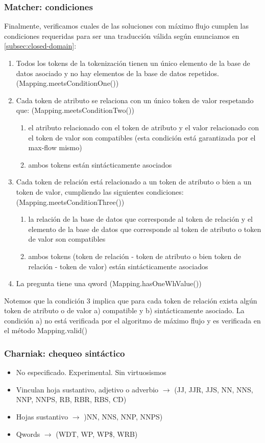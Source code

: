 \begin{frame}
\frametitle{Matcher: condiciones}

Finalmente, verificamos cuales de las soluciones con máximo flujo cumplen las condiciones requeridas para ser una traducción válida según enunciamos en \ref{subsec:closed-domain}:

\begin{enumerate}
\item Todos  los tokens de la tokenización tienen un único elemento de la base de datos asociado y no hay elementos de la base de datos repetidos. (Mapping.meetsConditionOne())
\item Cada token de atributo se relaciona con un único token de valor respetando que: (Mapping.meetsConditionTwo())
\begin{enumerate}
\item el atributo relacionado con el token de atributo y el valor relacionado con el token de valor son compatibles (esta condición está garantizada por el max-flow mismo)
\item ambos tokens están sintácticamente asociados
\end{enumerate}
\item Cada token de relación está relacionado a un token de atributo o bien a un token de valor, cumpliendo las siguientes condiciones: (Mapping.meetsConditionThree())
\begin{enumerate}
\item la relación de la base de datos que corresponde al token de relación y el elemento de la base de datos que corresponde al token de atributo o token de valor son compatibles
\item ambos tokens (token de relación - token de atributo o bien token de relación - token de valor) están sintácticamente asociados
\end{enumerate}
\item La pregunta tiene una qword (Mapping.hasOneWhValue())
\end{enumerate}

Notemos que la condición 3 implica que para cada token de relación exista algún token de atributo o de valor a) compatible y b) sintácticamente asociado. La condición a) no está verificada por el algoritmo de máximo flujo y es verificada en el método Mapping.valid()

\end{frame}


\begin{frame}
\frametitle{Charniak: chequeo sintáctico}
\begin{itemize}
\item No especificado. Experimental. Sin virtuosismos
\item Vinculan hoja sustantivo, adjetivo o adverbio $\rightarrow$ (JJ, JJR, JJS, NN, NNS, NNP, NNPS, RB, RBR, RBS, CD)
\item Hojas sustantivo $\rightarrow$ )NN, NNS, NNP, NNPS)
\item Qwords $\rightarrow$ (WDT, WP, WP\$, WRB)
\end{itemize}

\end{frame}

